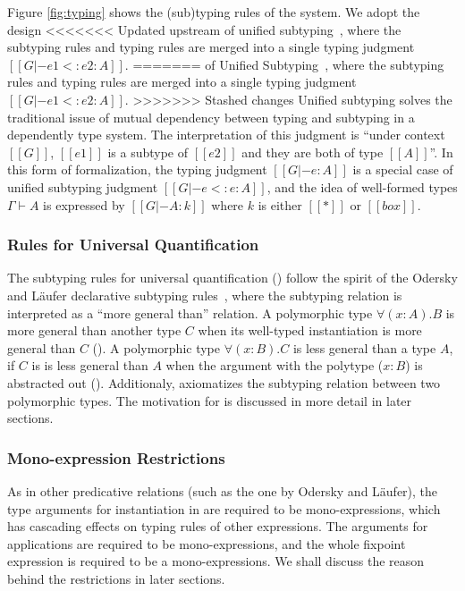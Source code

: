 Figure \ref{fig:typing} shows the (sub)typing rules of the system. We adopt the design
<<<<<<< Updated upstream
of unified subtyping~\cite{yang2017unifying}, where the subtyping rules and
typing rules are merged into a single typing judgment $[[G |- e1 <: e2 : A]]$. 
=======
of Unified Subtyping~\cite{yang2017unifying}, where the subtyping rules and
typing rules are merged into a single typing judgment $[[G |- e1 <: e2 : A]]$.
>>>>>>> Stashed changes
Unified subtyping solves the traditional issue of mutual dependency between typing
and subtyping in a dependently type system.
The interpretation of this judgment is ``under context $[[G]]$, $[[e1]]$ is a
subtype of $[[e2]]$ and they are both of type $[[A]]$''.
In this form of formalization, the typing judgment $[[G |- e : A]]$ is a
special case of unified subtyping judgment $[[G |- e <: e : A]]$,
and the idea of well-formed types $\Gamma \vdash A$ is expressed by
$[[G |- A : k]]$ where $k$ is either $[[*]]$ or $[[box]]$.

\subsubsection{Rules for Universal Quantification}
The subtyping rules for universal quantification () follow
the spirit of the Odersky and L\"aufer declarative subtyping rules~\cite{oderskylaufer,DunfieldJoshua2013Caeb},
where the subtyping relation is interpreted as a ``more general than'' relation.
A polymorphic type $\forall (x:A). B$
is more general than another type $C$ when its well-typed
instantiation is more general than $C$ (). A polymorphic
type $\forall (x:B). C$ is less general than a type $A$,
if $C$ is is less general than $A$ when the argument with the polytype ($x:B$)
is abstracted out (). Additionaly, 
axiomatizes the subtyping relation between two polymorphic types.
The motivation for  is discussed in more detail in later sections.

\subsubsection{Mono-expression Restrictions}
As in other predicative relations (such as the one by Odersky and L\"aufer),
the type arguments for instantiation in  are
required to be mono-expressions, which has cascading effects on typing rules of
other expressions. The arguments for applications are required to be
mono-expressions, and the whole fixpoint expression is required to be a
mono-expressions. We shall
discuss the reason behind the restrictions in later sections.

